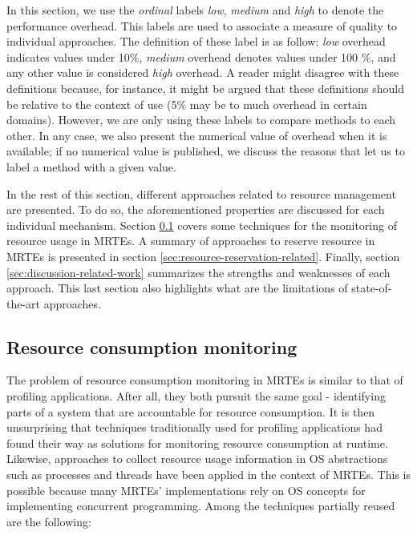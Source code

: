 \begin{itemize}
In this section, we use the \textit{ordinal} labels \textit{low}, \textit{medium} and \textit{high} to denote the performance overhead.
This labels are used to associate a measure of quality to individual approaches. 
The definition of these label is as follow: \textit{low} overhead indicates values under 10\%, \textit{medium} overhead denotes values under 100 \%, and any other value is considered \textit{high} overhead.
A reader might disagree with these definitions because, for instance, it might be argued that these definitions should be relative to the context of use (5\% may be to much overhead in certain domains).
However, we are only using these labels to compare methods to each other.
In any case, we also present the numerical value of overhead when it is available; if no numerical value is published, we discuss the reasons that let us to label a method with a given value.
\end{itemize}

In the rest of this section, different approaches related to resource management are presented.
To do so, the aforementioned properties are discussed for each individual mechanism.
Section \ref{sec:resource-consumption-monitoring-related} covers some techniques for the monitoring of resource usage in MRTEs.
A summary of approaches to reserve resource in MRTEs is presented in section \ref{sec:resource-reservation-related}.
Finally, section \ref{sec:discussion-related-work} summarizes the strengths and weaknesses of each approach.
This last section also highlights what are the limitations of state-of-the-art approaches.

\subsection{Resource consumption monitoring} \label{sec:resource-consumption-monitoring-related}

The problem of resource consumption monitoring in MRTEs is similar to that of profiling applications.
After all, they both pursuit the same goal - identifying parts of a system that are accountable for resource consumption.
It is then unsurprising that techniques traditionally used for profiling applications had found their way as solutions for monitoring resource consumption at runtime.
Likewise, approaches to collect resource usage information in OS abstractions such as processes and threads have been applied in the context of MRTEs.
This is possible because many MRTEs' implementations rely on OS concepts for implementing concurrent programming.
Among the techniques partially reused are the following:


